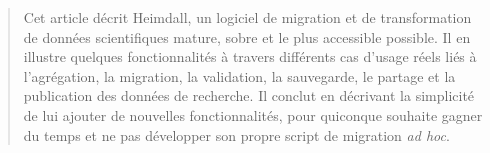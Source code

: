 \begin{abstract}
Cet article décrit Heimdall, un logiciel de migration et de transformation de données scientifiques mature, sobre et le plus accessible possible. Il en illustre quelques fonctionnalités à travers différents cas d'usage réels liés à l’agrégation, la migration, la validation, la sauvegarde, le partage et la publication des données de recherche. Il conclut en décrivant la simplicité de lui ajouter de nouvelles fonctionnalités, pour quiconque souhaite gagner du temps et ne pas développer son propre script de migration \emph{ad hoc}.

\end{abstract}